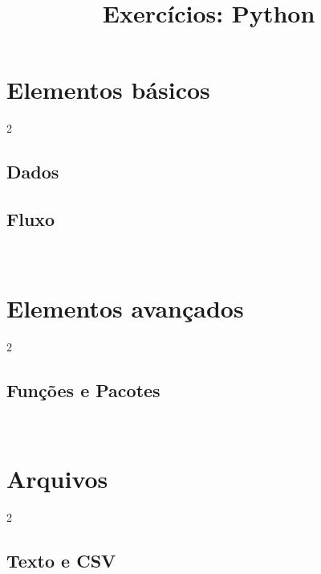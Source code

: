 \documentclass[12pt]{article}
\title{\textbf{Exercícios}: Python}
\date{}
\begin{document}
\sffamily
\maketitle

\section{Elementos básicos}
\begin{multicols}{2}
	\subsection{Dados}
			
		
	\vfill 	
		
	\subsection{Fluxo}	
		
\end{multicols}

	\vfill \ 	
	\newpage

\section{Elementos avançados}
\begin{multicols}{2}	
	\subsection*{Funções e Pacotes}
						
\end{multicols}

	\vfill \ 	
	\newpage

\section{Arquivos}
\begin{multicols}{2}	
	\subsection*{Texto e CSV}
						
\end{multicols}

\vfill
\tableofcontents
\end{document}

